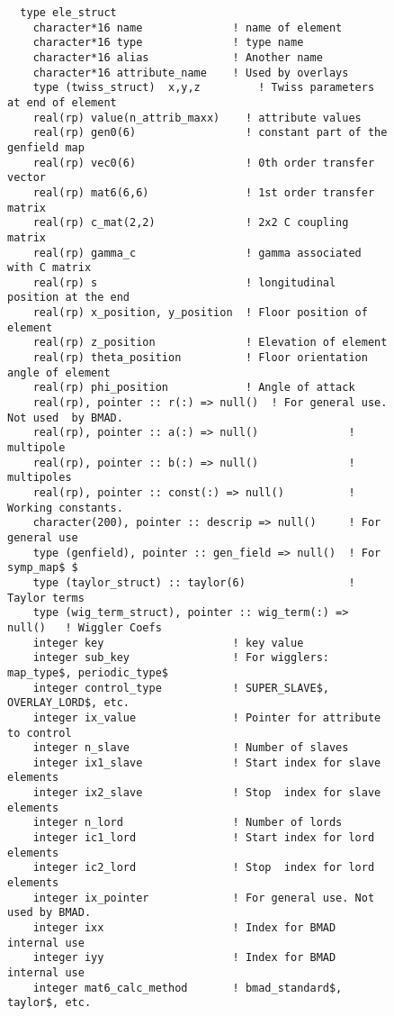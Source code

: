 \begin{figure}[tb]
\centering
\begin{verbatim}
  type ele_struct
    character*16 name              ! name of element
    character*16 type              ! type name 
    character*16 alias             ! Another name
    character*16 attribute_name    ! Used by overlays
    type (twiss_struct)  x,y,z         ! Twiss parameters at end of element
    real(rp) value(n_attrib_maxx)    ! attribute values
    real(rp) gen0(6)                 ! constant part of the genfield map
    real(rp) vec0(6)                 ! 0th order transfer vector
    real(rp) mat6(6,6)               ! 1st order transfer matrix
    real(rp) c_mat(2,2)              ! 2x2 C coupling matrix
    real(rp) gamma_c                 ! gamma associated with C matrix
    real(rp) s                       ! longitudinal position at the end
    real(rp) x_position, y_position  ! Floor position of element
    real(rp) z_position              ! Elevation of element
    real(rp) theta_position          ! Floor orientation angle of element
    real(rp) phi_position            ! Angle of attack
    real(rp), pointer :: r(:) => null()  ! For general use. Not used  by BMAD.
    real(rp), pointer :: a(:) => null()              ! multipole
    real(rp), pointer :: b(:) => null()              ! multipoles
    real(rp), pointer :: const(:) => null()          ! Working constants.
    character(200), pointer :: descrip => null()     ! For general use
    type (genfield), pointer :: gen_field => null()  ! For symp_map$ $
    type (taylor_struct) :: taylor(6)                ! Taylor terms
    type (wig_term_struct), pointer :: wig_term(:) => null()   ! Wiggler Coefs
    integer key                    ! key value
    integer sub_key                ! For wigglers: map_type$, periodic_type$
    integer control_type           ! SUPER_SLAVE$, OVERLAY_LORD$, etc.
    integer ix_value               ! Pointer for attribute to control
    integer n_slave                ! Number of slaves
    integer ix1_slave              ! Start index for slave elements
    integer ix2_slave              ! Stop  index for slave elements
    integer n_lord                 ! Number of lords
    integer ic1_lord               ! Start index for lord elements
    integer ic2_lord               ! Stop  index for lord elements
    integer ix_pointer             ! For general use. Not used by BMAD.
    integer ixx                    ! Index for BMAD internal use
    integer iyy                    ! Index for BMAD internal use
    integer mat6_calc_method       ! bmad_standard$, taylor$, etc.

\end{verbatim}
\end{figure}
